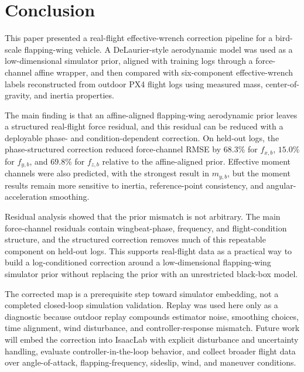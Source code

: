 \section{Conclusion}
\label{sec:conclusion}

This paper presented a real-flight effective-wrench correction pipeline for a bird-scale flapping-wing vehicle. A DeLaurier-style aerodynamic model was used as a low-dimensional simulator prior, aligned with training logs through a force-channel affine wrapper, and then compared with six-component effective-wrench labels reconstructed from outdoor PX4 flight logs using measured mass, center-of-gravity, and inertia properties.

The main finding is that an affine-aligned flapping-wing aerodynamic prior leaves a structured real-flight force residual, and this residual can be reduced with a deployable phase- and condition-dependent correction. On held-out logs, the phase-structured correction reduced force-channel RMSE by $68.3\%$ for $f_{x,b}$, $15.0\%$ for $f_{y,b}$, and $69.8\%$ for $f_{z,b}$ relative to the affine-aligned prior. Effective moment channels were also predicted, with the strongest result in $m_{y,b}$, but the moment results remain more sensitive to inertia, reference-point consistency, and angular-acceleration smoothing.

Residual analysis showed that the prior mismatch is not arbitrary. The main force-channel residuals contain wingbeat-phase, frequency, and flight-condition structure, and the structured correction removes much of this repeatable component on held-out logs. This supports real-flight data as a practical way to build a log-conditioned correction around a low-dimensional flapping-wing simulator prior without replacing the prior with an unrestricted black-box model.

The corrected map is a prerequisite step toward simulator embedding, not a completed closed-loop simulation validation. Replay was used here only as a diagnostic because outdoor replay compounds estimator noise, smoothing choices, time alignment, wind disturbance, and controller-response mismatch. Future work will embed the correction into IsaacLab with explicit disturbance and uncertainty handling, evaluate controller-in-the-loop behavior, and collect broader flight data over angle-of-attack, flapping-frequency, sideslip, wind, and maneuver conditions.
